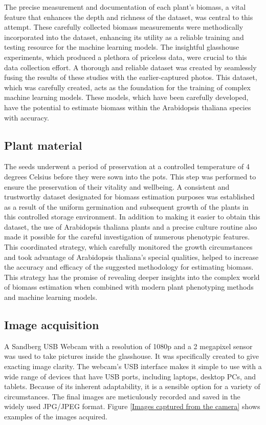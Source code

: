 \documentclass[a4paper,12pt]{report}%
\renewcommand{\\}{\vspace*{0.5\baselineskip} \newline}
\begin{document}
\noindent The precise measurement and documentation of each plant's biomass, a vital feature that enhances the depth and richness of the dataset, was central to this attempt. These carefully collected biomass measurements were methodically incorporated into the dataset, enhancing its utility as a reliable training and testing resource for the machine learning models. 
The insightful glasshouse experiments, which produced a plethora of priceless data, were crucial to this data collection effort. A thorough and reliable dataset was created by seamlessly fusing the results of these studies with the earlier-captured photos. This dataset, which was carefully created, acts as the foundation for the training of complex machine learning models. These models, which have been carefully developed, have the potential to estimate biomass within the Arabidopsis thaliana species with accuracy.



\subsection{Plant material}
The seeds underwent a period of preservation at a controlled temperature of 4 degrees Celsius before they were sown into the pots. This step was performed to ensure the preservation of their vitality and wellbeing. A consistent and trustworthy dataset designated for biomass estimation purposes was established as a result of the uniform germination and subsequent growth of the plants in this controlled storage environment. In addition to making it easier to obtain this dataset, the use of Arabidopsis thaliana plants and a precise culture routine also made it possible for the careful investigation of numerous phenotypic features.
This coordinated strategy, which carefully monitored the growth circumstances and took advantage of Arabidopsis thaliana's special qualities, helped to increase the accuracy and efficacy of the suggested methodology for estimating biomass. This strategy has the promise of revealing deeper insights into the complex world of biomass estimation when combined with modern plant phenotyping methods and machine learning models.



\subsection{Image acquisition}
A Sandberg USB Webcam with a resolution of 1080p and a 2 megapixel sensor was used to take pictures inside the glasshouse. It was specifically created to give exacting image clarity. The webcam's USB interface makes it simple to use with a wide range of devices that have USB ports, including laptops, desktop PCs, and tablets. Because of its inherent adaptability, it is a sensible option for a variety of circumstances. The final images are meticulously recorded and saved in the widely used JPG/JPEG format. Figure \ref{Images captured from the camera} shows examples of the images acquired.
\end{document}
